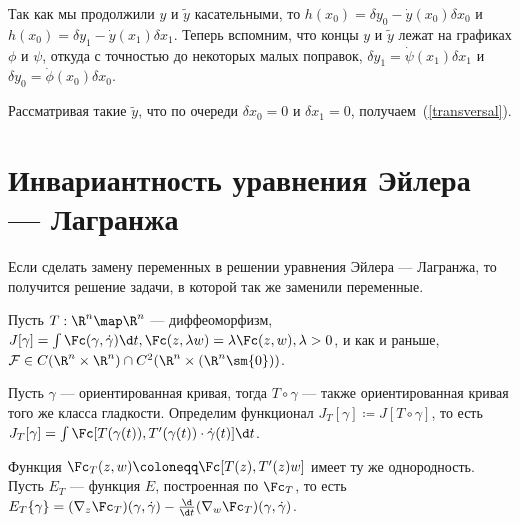 \documentclass[a4paper]{article}
\begin{document}
    Так как мы продолжили $y$ и $\tilde{y}$ касательными, то $h(x_0) = \delta y_0 - \dot{y}(x_0)\delta x_0$ и $h(x_0) = \delta y_1 - \dot{y}(x_1)\delta x_1$.
    Теперь вспомним, что концы $y$ и $\tilde{y}$ лежат на графиках $\phi$ и $\psi$, откуда с точностью до некоторых малых поправок, $\delta y_1 = \dot{\psi}(x_1)\delta x_1$ и $\delta y_0 = \dot{\phi}(x_0)\delta x_0$.
    
    Рассматривая такие $\tilde{y}$, что по очереди $\delta x_0 = 0$ и $\delta x_1 = 0$, получаем~(\ref{transversal}).
    \section{Инвариантность уравнения Эйлера --- Лагранжа}
    Если сделать замену переменных в решении уравнения Эйлера --- Лагранжа, то получится решение задачи, в которой так же заменили переменные.

    Пусть $T: \R^n \map \R^n$ --- диффеоморфизм, $J[\gamma] = \int\Fc(\gamma, \dot{\gamma})\d t, \Fc(z, \lambda w) = \lambda\Fc(z, w), \lambda > 0$, и как и раньше, $\mathcal{F} \in C(\R^n \times \R^n) \cap C^2(\R^n \times (\R^n \sm \{0\}))$.

    Пусть $\gamma$ --- ориентированная кривая, тогда $T \circ \gamma$ --- также ориентированная кривая того же класса гладкости.
    Определим функционал $J_T[\gamma] \coloneqq J[T \circ \gamma]$, то есть $J_T[\gamma] = \int \Fc[T(\gamma(t)), T'(\gamma(t)) \cdot \dot{\gamma}(t)]\d t$.

    Функция $\Fc_T(z, w) \coloneqq \Fc[T(z), T'(z)w]$ имеет ту же однородность.
    Пусть $E_T$ --- функция $E$, построенная по $\Fc_T$, то есть $E_T\{\gamma\} = (\nabla_{z} \Fc_T)(\gamma, \dot{\gamma}) - \frac{\d}{\d t}(\nabla_w \Fc_T)(\gamma, \dot{\gamma})$.
\end{document}
